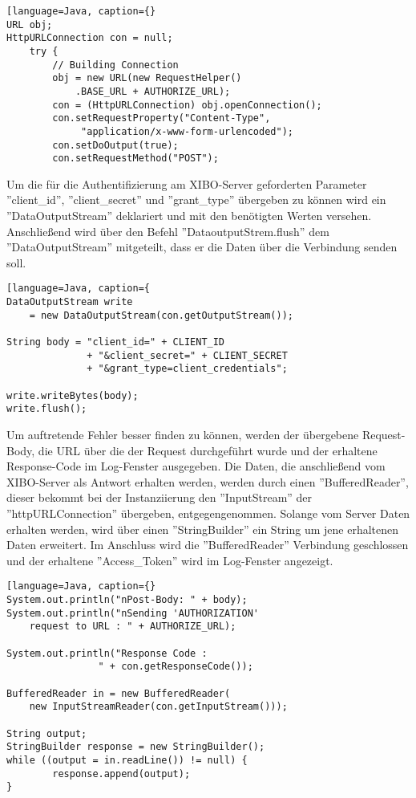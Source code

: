 \begin{lstlisting}[language=Java, caption={}
URL obj;
HttpURLConnection con = null;
	try {
    	// Building Connection
        obj = new URL(new RequestHelper()
        	.BASE_URL + AUTHORIZE_URL);
       	con = (HttpURLConnection) obj.openConnection();
        con.setRequestProperty("Content-Type",
             "application/x-www-form-urlencoded");    
        con.setDoOutput(true);
        con.setRequestMethod("POST");
\end{lstlisting}

Um die für die Authentifizierung am XIBO-Server geforderten Parameter ''client\_id'', ''client\_secret'' und ''grant\_type'' übergeben zu können wird ein ''DataOutputStream'' deklariert und mit den benötigten Werten versehen. Anschließend wird über den Befehl  ''DataoutputStrem.flush'' dem ''DataOutputStream'' mitgeteilt, dass er die Daten über die Verbindung senden soll.
\begin{lstlisting}[language=Java, caption={
DataOutputStream write 
	= new DataOutputStream(con.getOutputStream());
	 
String body = "client_id=" + CLIENT_ID
              + "&client_secret=" + CLIENT_SECRET
              + "&grant_type=client_credentials";

write.writeBytes(body);
write.flush();
\end{lstlisting}

Um auftretende Fehler besser finden zu können, werden der übergebene Request-Body, die URL über die der Request durchgeführt wurde und der erhaltene Response-Code im Log-Fenster ausgegeben. Die Daten, die anschließend vom XIBO-Server als Antwort erhalten werden, werden durch einen ''BufferedReader'', dieser bekommt bei der Instanziierung den ''InputStream'' der ''httpURLConnection'' übergeben, entgegengenommen. Solange vom Server Daten erhalten werden, wird über einen ''StringBuilder'' ein String um jene erhaltenen Daten erweitert. Im Anschluss wird die ''BufferedReader'' Verbindung geschlossen und der erhaltene ''Access\_Token'' wird im Log-Fenster angezeigt.

\begin{lstlisting}[language=Java, caption={}
System.out.println("nPost-Body: " + body);
System.out.println("nSending 'AUTHORIZATION'
    request to URL : " + AUTHORIZE_URL);
             
System.out.println("Response Code :
				" + con.getResponseCode());

BufferedReader in = new BufferedReader(
    new InputStreamReader(con.getInputStream()));
    
String output;
StringBuilder response = new StringBuilder();
while ((output = in.readLine()) != null) {
        response.append(output);
}
\end{lstlisting}

